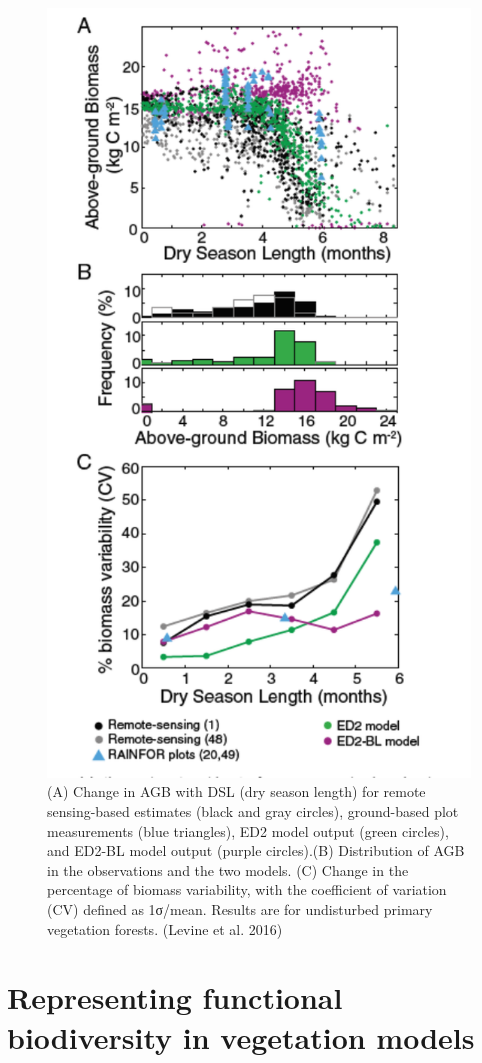 \documentclass[
  12pt,
  oneside]{book}
\begin{document}
\begin{figure}

{\centering \includegraphics[width=0.8\linewidth]{figures/chap6/f638_levine2} 

}

\caption{(A) Change in AGB with DSL (dry season length) for remote sensing-based estimates (black and gray circles), ground-based plot measurements (blue triangles), ED2 model output (green circles), and ED2-BL model output (purple circles).(B) Distribution of AGB in the observations and the two models. (C) Change in the percentage of biomass variability, with the coefficient of variation (CV) defined as 1σ/mean. Results are for undisturbed primary vegetation forests. (Levine et al. 2016) }\label{fig:f638}
\end{figure}

\hypertarget{representing-functional-biodiversity-in-vegetation-models}{%
\chapter{Representing functional biodiversity in vegetation models}\label{representing-functional-biodiversity-in-vegetation-models}}
\end{document}
